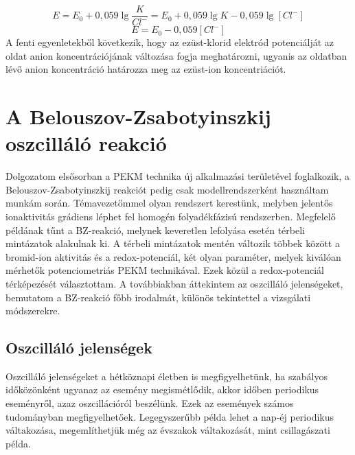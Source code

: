 \begin{enumerate}
\begin{equation}
E = E_\text{0} + 0,059 \lg \frac{K}{Cl^-} = E_\text{0} + 0,059 \lg K - 0,059 \lg [Cl^-]
\end{equation}
\begin{equation}
E = E_\text{0} - 0,059 [Cl^-]
\end{equation}
A fenti egyenletekből következik, hogy az ezüst-klorid elektród potenciálját az oldat anion koncentrációjának változása fogja meghatározni, ugyanis az oldatban lévő anion koncentráció határozza meg az ezüst-ion koncentriációt.
\end{enumerate}
    

\section{A Belouszov-Zsabotyinszkij oszcilláló reakció}
Dolgozatom elsősorban a PEKM technika új alkalmazási területével foglalkozik, a Belouszov-Zsabotyinszkij reakciót pedig csak modellrendszerként használtam munkám során. Témavezetőmmel olyan rendszert kerestünk, melyben jelentős ionaktivitás grádiens léphet fel homogén folyadékfázisú rendszerben. Megfelelő példának tűnt a BZ-reakció, melynek keveretlen lefolyása esetén térbeli mintázatok alakulnak ki. A térbeli mintázatok mentén változik többek között a bromid-ion aktivitás és a redox-potenciál, két olyan paraméter, melyek kiválóan mérhetők potenciometriás PEKM technikával. Ezek közül a redox-potenciál térképezését választottam. A továbbiakban áttekintem az oszcilláló jelenségeket, bemutatom a BZ-reakció főbb irodalmát, különös tekintettel a vizsgálati módszerekre.

\subsection{Oszcilláló jelenségek}
Oszcilláló jelenségeket a hétköznapi életben is megfigyelhetünk, ha szabályos időközönként ugyanaz az esemény megismétlődik, akkor időben periodikus eseményről, azaz oszcillációról beszélünk. Ezek az események számos tudományban megfigyelhetőek. Legegyszerűbb példa lehet a nap-éj periodikus váltakozása, megemlíthetjük még az évszakok váltakozását, mint csillagászati példa.


